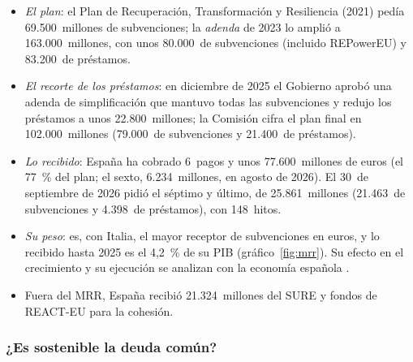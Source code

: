 \documentclass[11pt]{article}
\begin{document}
\begin{itemize}
\item \emph{El plan}: el Plan de Recuperación, Transformación y Resiliencia (2021) pedía 69.500~millones de subvenciones; la \emph{adenda} de 2023 lo amplió a 163.000~millones, con unos 80.000~de subvenciones (incluido REPowerEU) y 83.200~de préstamos.
\item \emph{El recorte de los préstamos}: en diciembre de 2025 el Gobierno aprobó una adenda de simplificación que mantuvo todas las subvenciones y redujo los préstamos a unos 22.800~millones; la Comisión cifra el plan final en 102.000~millones (79.000~de subvenciones y 21.400~de préstamos)\nocite{CE2026PlanEspana}.
\item \emph{Lo recibido}: España ha cobrado 6~pagos y unos 77.600~millones de euros (el 77~\% del plan; el sexto, 6.234~millones, en agosto de 2026). El 30~de septiembre de 2026 pidió el séptimo y último, de 25.861~millones (21.463~de subvenciones y 4.398~de préstamos), con 148~hitos\nocite{Gobierno2026PRTR}.
\item \emph{Su peso}: es, con Italia, el mayor receptor de subvenciones en euros, y lo recibido hasta 2025 es el 4,2~\% de su PIB (gráfico~\ref{fig:mrr}). Su efecto en el crecimiento y su ejecución se analizan con la economía española  .
\item Fuera del MRR, España recibió 21.324~millones del SURE y fondos de REACT-EU para la cohesión.
\end{itemize}

\subsubsection{¿Es sostenible la deuda común?}\label{sec:sostenibilidad}
\end{document}
